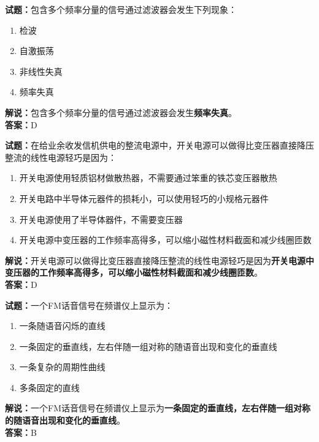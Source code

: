 \documentclass{ctexbook}
\begin{document}
\noindent\textbf{试题：}包含多个频率分量的信号通过滤波器会发生下列现象：

\begin{enumerate}[leftmargin=3em]
  \item 检波
  \item 自激振荡
  \item 非线性失真
  \item 频率失真
\end{enumerate}

\noindent\textbf{解说：}包含多个频率分量的信号通过滤波器会发生\textbf{频率失真}。\\\noindent\textbf{答案：}D

\bigskip

\noindent\textbf{试题：}在给业余收发信机供电的整流电源中，开关电源可以做得比变压器直接降压整流的线性电源轻巧是因为：

\begin{enumerate}[leftmargin=3em]
  \item 开关电源使用轻质铝材做散热器，不需要通过笨重的铁芯变压器散热
  \item 开关电路中半导体元器件的损耗小，可以使用轻巧的小规格元器件
  \item 开关电源使用了半导体器件，不需要变压器
  \item 开关电源中变压器的工作频率高得多，可以缩小磁性材料截面和减少线圈匝数
\end{enumerate}

\noindent\textbf{解说：}开关电源可以做得比变压器直接降压整流的线性电源轻巧是因为\textbf{开关电源中变压器的工作频率高得多，可以缩小磁性材料截面和减少线圈匝数}。\\\noindent\textbf{答案：}D%

\bigskip

\noindent\textbf{试题：}一个FM话音信号在频谱仪上显示为：

\begin{enumerate}[leftmargin=3em]
  \item 一条随语音闪烁的直线
  \item 一条固定的垂直线，左右伴随一组对称的随语音出现和变化的垂直线
  \item 一条复杂的周期性曲线
  \item 多条固定的直线
\end{enumerate}

\noindent\textbf{解说：}一个FM话音信号在频谱仪上显示为\textbf{一条固定的垂直线，左右伴随一组对称的随语音出现和变化的垂直线}。\\\noindent\textbf{答案：}B%
\end{document}
